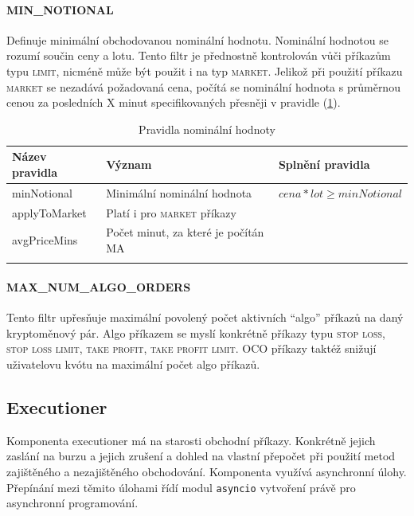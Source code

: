 \paragraph*{MIN\_NOTIONAL}
Definuje minimální obchodovanou nominální hodnotu. Nominální hodnotou se rozumí součin ceny a lotu. Tento filtr je přednostně kontrolován vůči příkazům typu \textsc{limit}, nicméně
může být použit i na typ \textsc{market}. Jelikož při použití příkazu \textsc{market} se nezadává požadovaná cena, počítá se nominální hodnota s průměrnou cenou za posledních X minut
specifikovaných přesněji v pravidle (\ref{tab:binance:notional_filter}).
\begin{center}
    \begin{longtable}[h]{|l|l|l|}
        \hline
        Název pravidla & Význam                              & Splnění pravidla                \\
        \hline
        minNotional    & Minimální nominální hodnota         & $ cena * lot \geq minNotional $ \\ 
        \hline
        applyToMarket  & Platí i pro \textsc{market} příkazy &                                 \\ 
        \hline
        avgPriceMins   & Počet minut, za které je počítán MA &                                 \\ 
        \hline
        \caption{Pravidla nominální hodnoty}
        \label{tab:binance:notional_filter}
    \end{longtable}
\end{center}

\paragraph*{MAX\_NUM\_ALGO\_ORDERS}
Tento filtr upřesňuje maximální povolený počet aktivních \enquote{algo} příkazů na daný kryptoměnový pár. Algo příkazem se myslí konkrétně příkazy typu
\textsc{stop loss, stop loss limit, take profit, take profit limit}. OCO příkazy taktéž snižují uživatelovu kvótu na maximální počet algo příkazů. 

\subsection{Executioner}
Komponenta executioner má na starosti obchodní příkazy. Konkrétně jejich zaslání na burzu a jejich zrušení a dohled na vlastní přepočet při použití metod zajištěného a nezajištěného obchodování. Komponenta
využívá asynchronní úlohy. Přepínání mezi těmito úlohami řídí modul \verb|asyncio| vytvoření právě pro asynchronní programování.

